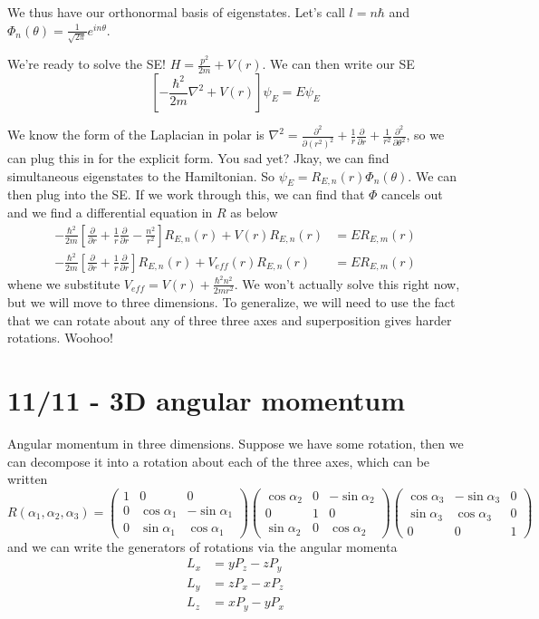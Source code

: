\documentclass[10pt]{report}
\newcommand{\pd}[2]{\frac{\partial #1}{\partial#2}}
\newcommand{\ptd}[2]{\frac{\partial^2 #1}{\partial#2^2}}
\begin{document}
We thus have our orthonormal basis of eigenstates. Let's call $l = n\hbar$ and $\Phi_n(\theta) = \frac{1}{\sqrt{2\pi}} e^{in\theta}$.

We're ready to solve the SE! $H = \frac{p^2}{2m} + V(r)$. We can then write our SE
$$\left[ -\frac{\hbar^2}{2m}\nabla^2 + V(r) \right]\psi_E = E\psi_E$$

We know the form of the Laplacian in polar is $\nabla^2 = \ptd{}{(r^2)} + \frac{1}{r}\pd{}{r} + \frac{1}{r^2}\ptd{}{\theta}$, so we can plug this in for the explicit form. You sad yet? Jkay, we can find simultaneous eigenstates to the Hamiltonian. So $\psi_E = R_{E,n}(r) \Phi_n(\theta)$. We can then plug into the SE. If we work through this, we can find that $\Phi$ cancels out and we find a differential equation in $R$ as below
\begin{align}
	-\frac{\hbar^2}{2m}\left[ \pd{}{r} + \frac{1}{r}\pd{}{r} - \frac{n^2}{r^2} \right]R_{E,n}(r) + V(r) R_{E,n}(r) &= ER_{E,m}(r)\\
	-\frac{\hbar^2}{2m}\left[ \pd{}{r} + \frac{1}{r}\pd{}{r}  \right]R_{E,n}(r) + V_{eff}(r) R_{E,n}(r) &= ER_{E,m}(r)
\end{align}
whene we substitute $V_{eff}=V(r) + \frac{\hbar^2n^2}{2mr^2}$. We won't actually solve this right now, but we will move to three dimensions. To generalize, we will need to use the fact that we can rotate about any of three three axes and superposition gives harder rotations. Woohoo!
\chapter{11/11 - 3D angular momentum}

Angular momentum in three dimensions. Suppose we have some rotation, then we can decompose it into a rotation about each of the three axes, which can be written
$$R(\alpha_1, \alpha_2, \alpha_3) = \begin{pmatrix}1 & 0 & 0\\0 & \cos \alpha_1 & -\sin \alpha_1\\0 & \sin \alpha_1 & \cos \alpha_1\end{pmatrix}\begin{pmatrix}\cos \alpha_2 & 0 & -\sin\alpha_2\\0 & 1 & 0\\\sin \alpha_2 & 0 & \cos \alpha_2\end{pmatrix}\begin{pmatrix}\cos \alpha_3 & -\sin \alpha_3 & 0\\\sin \alpha_3 & \cos \alpha_3 & 0\\0 & 0 & 1\end{pmatrix}$$
and we can write the generators of rotations via the angular momenta
\begin{align}
	L_x &= yP_z - zP_y\\
	L_y &= zP_x - xP_z\\
	L_z &= xP_y - yP_x
\end{align}
\end{document}
